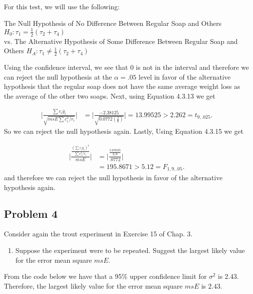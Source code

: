 \documentclass[12pt,]{article}
\providecommand{\tightlist}{%
  \setlength{\itemsep}{0pt}\setlength{\parskip}{0pt}}
\begin{document}
For this test, we will use the following:

\begin{center}
 The Null Hypothesis of No Difference Between Regular Soap and Others  $H_0 : \tau_1 = \frac{1}{2}(\tau_2+ \tau_4)$ \\
 vs. The Alternative Hypothesis of Some Difference Between Regular Soap and Others $H_A : \tau_1 \neq \frac{1}{2}(\tau_2+ \tau_4)$
\end{center}

Using the confidence interval, we see that 0 is not in the interval and
therefore we can reject the null hypothesis at the \(\alpha=.05\) level
in favor of the alternative hypothesis that the regular soap does not
have the same average weight loss as the average of the other two soaps.
Next, using Equation 4.3.13 we get

\[
 \begin{aligned}
 \Bigg| \frac{\sum c_i \bar{y}_i}{\sqrt{msE \sum c_i^2/r_i}}  \Bigg|
 &=  \Bigg| \frac{-2.38125}{\sqrt{0.0772 \left( \frac{3}{8} \right)}}  \Bigg| = 13.99525 > 2.262 = t_{9,.025}.
  \end{aligned}
 \] So we can reject the null hypothesis again. Lastly, Using Equation
4.3.15 we get

\[
 \begin{aligned}
 \Bigg| \frac{ \frac{\left(\sum c_i \bar{y}_i\right)^2}{\sum c_i^2/r_i} }{ msE }  \Bigg|
 &=   \Bigg| \frac{ \frac{5.67035 }{3/8} }{ .0772 }  \Bigg|\\
 &=195.8671 > 5.12 = F_{1,9,.05}.
  \end{aligned}
 \] and therefore we can reject the null hypothesis in favor of the
alternative hypothesis again.

\subsection{Problem 4}\label{problem-4}

Consider again the trout experiment in Exercise 15 of Chap. 3.

\begin{enumerate}
\def\labelenumi{(\alph{enumi})}
\tightlist
\item
  Suppose the experiment were to be repeated. Suggest the largest likely
  value for the error mean square \(msE\).
\end{enumerate}

From the code below we have that a 95\% upper confidence limit for
\(\sigma^2\) is 2.43. Therefore, the largest likely value for the error
mean square \(msE\) is \(2.43\).
\end{document}
